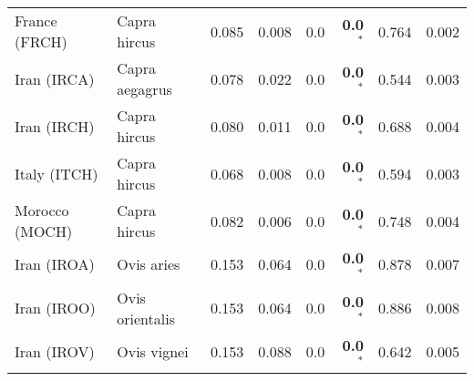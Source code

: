\begin{center}
\begin{adjustbox}{width = 1\textwidth}
\begin{tabular}{|l|l|r|r|r|r|r|r|}
                  France (FRCH) &         Capra hircus &                                              0.085 &                                              0.008 &              0.0 &                    \textbf{0.0}$\bm{^*}$ &                                              0.764 &              0.002 \\
                    Iran (IRCA) &       Capra aegagrus &                                              0.078 &                                              0.022 &              0.0 &                    \textbf{0.0}$\bm{^*}$ &                                              0.544 &              0.003 \\
                    Iran (IRCH) &         Capra hircus &                                              0.080 &                                              0.011 &              0.0 &                    \textbf{0.0}$\bm{^*}$ &                                              0.688 &              0.004 \\
                   Italy (ITCH) &         Capra hircus &                                              0.068 &                                              0.008 &              0.0 &                    \textbf{0.0}$\bm{^*}$ &                                              0.594 &              0.003 \\
                 Morocco (MOCH) &         Capra hircus &                                              0.082 &                                              0.006 &              0.0 &                    \textbf{0.0}$\bm{^*}$ &                                              0.748 &              0.004 \\
                    Iran (IROA) &           Ovis aries &                                              0.153 &                                              0.064 &              0.0 &                    \textbf{0.0}$\bm{^*}$ &                                              0.878 &              0.007 \\
                    Iran (IROO) &      Ovis orientalis &                                              0.153 &                                              0.064 &              0.0 &                    \textbf{0.0}$\bm{^*}$ &                                              0.886 &              0.008 \\
                    Iran (IROV) &          Ovis vignei &                                              0.153 &                                              0.088 &              0.0 &                    \textbf{0.0}$\bm{^*}$ &                                              0.642 &              0.005 \\

\end{tabular}
\end{adjustbox}
\end{center}
